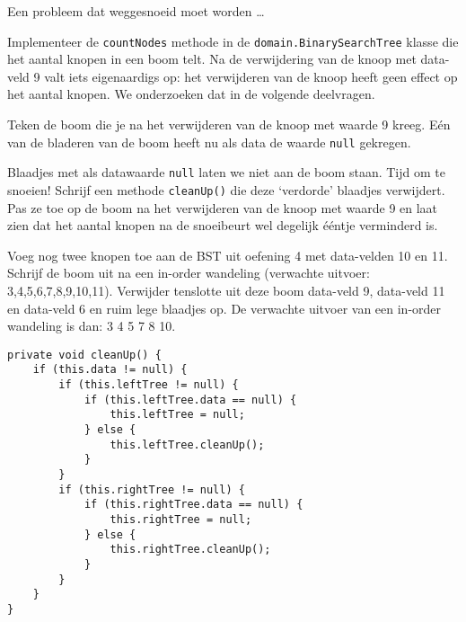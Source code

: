 \begin{oef}
\begin{opl}
\end{opl}
\end{oef}




\begin{oef}
\papier \code Een probleem dat weggesnoeid moet worden …
\begin{oefenumerate}
\item Implementeer de \verb=countNodes= methode in de \verb=domain.BinarySearchTree= klasse die het aantal knopen in een boom telt. Na de verwijdering van de knoop met data-veld 9 valt iets eigenaardigs op: het verwijderen van de knoop heeft geen effect op het aantal knopen. We onderzoeken dat in de volgende deelvragen.
	\item Teken  de boom die je na het verwijderen van de knoop met waarde 9 kreeg. Eén van de bladeren van de boom heeft nu als data de waarde \verb+null+ gekregen.
	\item Blaadjes met als datawaarde \verb+null+ laten we niet aan de boom staan. Tijd om te snoeien! Schrijf een methode \verb+cleanUp()+ die deze ‘verdorde’ blaadjes verwijdert. Pas ze toe op de boom na het verwijderen van de knoop met waarde 9 en laat zien dat het aantal knopen na de snoeibeurt wel degelijk ééntje verminderd is.  
	\item Voeg nog twee knopen toe aan de BST uit oefening 4 met data-velden 10 en 11. Schrijf de boom uit na een in-order wandeling (verwachte uitvoer: 3,4,5,6,7,8,9,10,11). Verwijder tenslotte uit deze boom data-veld 9, data-veld 11 en data-veld 6 en ruim lege blaadjes op. De verwachte uitvoer van een in-order wandeling is dan: 3 4 5 7 8 10.
\end{oefenumerate}
\begin{opl}
\begin{lstlisting}[caption={ruimOp methode}, label=bstruimop]
private void cleanUp() {
	if (this.data != null) {
		if (this.leftTree != null) {
			if (this.leftTree.data == null) {
				this.leftTree = null;
			} else {
				this.leftTree.cleanUp();
			}
		}
		if (this.rightTree != null) {
			if (this.rightTree.data == null) {
				this.rightTree = null;
			} else {
				this.rightTree.cleanUp();
			}
		}
	}
}
\end{lstlisting}
\end{opl}

\end{oef}


